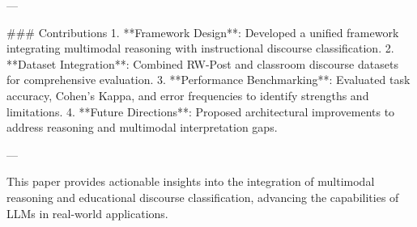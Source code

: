 ---

### Contributions
1. **Framework Design**: Developed a unified framework integrating multimodal reasoning with instructional discourse classification.
2. **Dataset Integration**: Combined RW-Post and classroom discourse datasets for comprehensive evaluation.
3. **Performance Benchmarking**: Evaluated task accuracy, Cohen's Kappa, and error frequencies to identify strengths and limitations.
4. **Future Directions**: Proposed architectural improvements to address reasoning and multimodal interpretation gaps.

--- 

This paper provides actionable insights into the integration of multimodal reasoning and educational discourse classification, advancing the capabilities of LLMs in real-world applications.